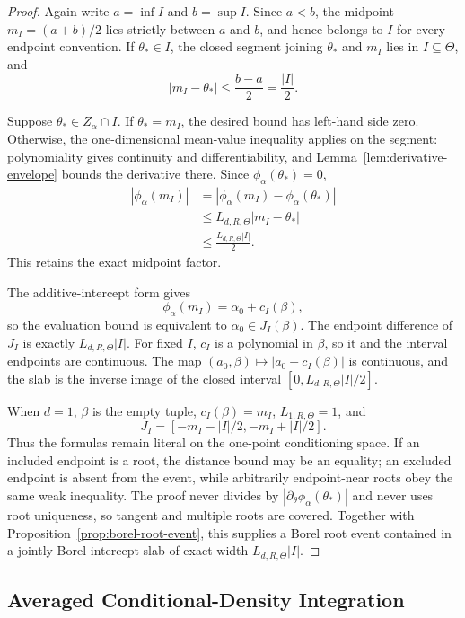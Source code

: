 \begin{proof}
Again write $a=\inf I$ and $b=\sup I$.  Since $a<b$, the midpoint
$m_I=(a+b)/2$ lies strictly between $a$ and $b$, and hence belongs to
$I$ for every endpoint convention.  If $\theta_*\in I$, the closed
segment joining $\theta_*$ and $m_I$ lies in $I\subseteq\Theta$, and
\[
|m_I-\theta_*|\leq\frac{b-a}{2}=\frac{|I|}{2}.
\]

Suppose $\theta_*\in Z_\alpha\cap I$.  If $\theta_*=m_I$, the desired
bound has left-hand side zero.  Otherwise, the one-dimensional
mean-value inequality applies on the segment: polynomiality gives
continuity and differentiability, and Lemma~\ref{lem:derivative-envelope}
bounds the derivative there.  Since $\phi_\alpha(\theta_*)=0$,
\[
\begin{aligned}
|\phi_\alpha(m_I)|
&=|\phi_\alpha(m_I)-\phi_\alpha(\theta_*)|\\
&\leq L_{d,R,\Theta}|m_I-\theta_*|\\
&\leq\frac{L_{d,R,\Theta}|I|}{2}.
\end{aligned}
\]
This retains the exact midpoint factor.

The additive-intercept form gives
\[
\phi_\alpha(m_I)=\alpha_0+c_I(\beta),
\]
so the evaluation bound is equivalent to
$\alpha_0\in J_I(\beta)$.  The endpoint difference of $J_I$ is exactly
$L_{d,R,\Theta}|I|$.  For fixed $I$, $c_I$ is a polynomial in $\beta$,
so it and the interval endpoints are continuous.  The map
$(a_0,\beta)\mapsto|a_0+c_I(\beta)|$ is continuous, and the slab is the
inverse image of the closed interval
$[0,L_{d,R,\Theta}|I|/2]$.

When $d=1$, $\beta$ is the empty tuple,
$c_I(\beta)=m_I$, $L_{1,R,\Theta}=1$, and
\[
J_I=[-m_I-|I|/2,-m_I+|I|/2].
\]
Thus the formulas remain literal on the one-point conditioning space.
If an included endpoint is a root, the distance bound may be an equality;
an excluded endpoint is absent from the event, while arbitrarily
endpoint-near roots obey the same weak inequality.  The proof never
divides by $|\partial_\theta\phi_\alpha(\theta_*)|$ and never uses root
uniqueness, so tangent and multiple roots are covered.  Together with
Proposition~\ref{prop:borel-root-event}, this supplies a Borel root event
contained in a jointly Borel intercept slab of exact width
$L_{d,R,\Theta}|I|$.
\end{proof}

\subsection{Averaged Conditional-Density Integration}
\label{app:averaged-integration}

